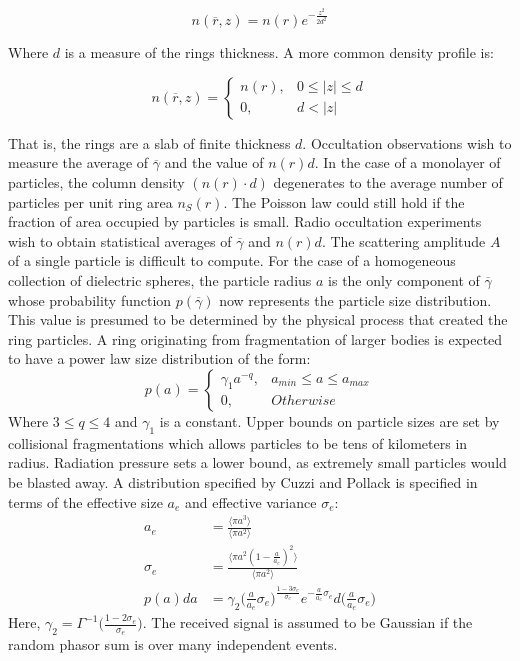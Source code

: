 \documentclass[oneside]{book}
\theoremstyle{mystyle}
\begin{document}
\begin{equation}
n(\overline{r},z) = n(r)e^{-\frac{z^2}{2d^2}}
\end{equation}

Where $d$ is a measure of the rings thickness. A more common density profile is:

\begin{equation}
n(\overline{r},z) = \begin{cases} n(r), & 0\leq |z| \leq d \\ 0, & d<|z|\end{cases}
\end{equation}

That is, the rings are a slab of finite thickness $d$. Occultation observations wish to measure the average of $\overline{\gamma}$ and the value of $n(r)d$. In the case of a monolayer of particles, the column density $(n(r)\cdot d)$ degenerates to the average number of particles per unit ring area $n_{S}(r)$. The Poisson law could still hold if the fraction of area occupied by particles is small. Radio occultation experiments wish to obtain statistical averages of $\overline{\gamma}$ and $n(r)d$. The scattering amplitude $A$ of a single particle is difficult to compute. For the case of a homogeneous collection of dielectric spheres, the particle radius $a$ is the only component of $\overline{\gamma}$ whose probability function $p(\overline{\gamma})$ now represents the particle size distribution. This value is presumed to be determined by the physical process that created the ring particles. A ring originating from fragmentation of larger bodies is expected to have a power law size distribution of the form:
\begin{equation}
p(a) = \begin{cases} \gamma_{1}a^{-q}, & a_{min}\leq a \leq a_{max} \\ 0, & Otherwise\end{cases}
\end{equation}
Where $3\leq q \leq 4$ and $\gamma_{1}$ is a constant. Upper bounds on particle sizes are set by collisional fragmentations which allows particles to be tens of kilometers in radius. Radiation pressure sets a lower bound, as extremely small particles would be blasted away. A distribution specified by Cuzzi and Pollack is specified in terms of the effective size $a_{e}$ and effective variance $\sigma_{e}$:
\begin{align}
a_{e} &= \frac{\langle \pi a^3\rangle}{\langle \pi a^2\rangle}\\
\sigma_{e} &= \frac{\langle \pi a^2(1-\frac{a}{a_{e}})^2\rangle}{\langle \pi a^2\rangle}\\
p(a)da &= \gamma_{2}\bigg(\frac{a}{a_{e}}\sigma_{e}\bigg)^{\frac{1-3\sigma_{e}}{\sigma_{e}}}e^{-\frac{a}{a_{e}}\sigma_{e}}d\bigg(\frac{a}{a_{e}}\sigma_{e}\bigg)
\end{align}
Here, $\gamma_{2} = \Gamma^{-1}\big(\frac{1-2\sigma_{e}}{\sigma_{e}}\big)$. The received signal is assumed to be Gaussian if the random phasor sum is over many independent events. 
\end{document}
